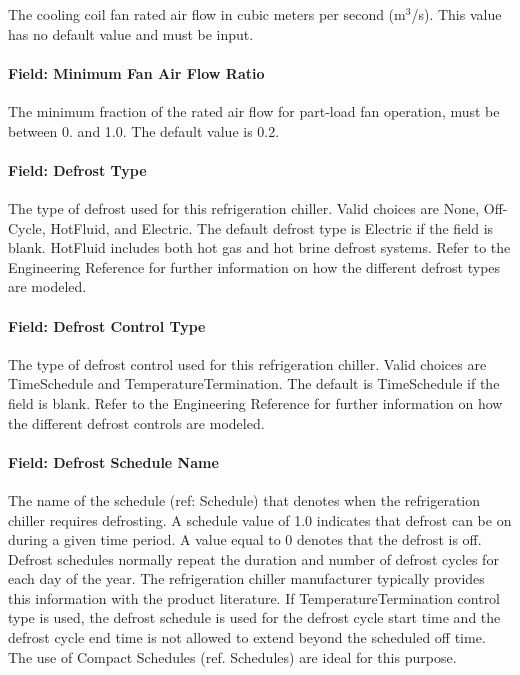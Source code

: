 The cooling coil fan rated air flow in cubic meters per second (m\(^{3}\)/s). This value has no default value and must be input.

\paragraph{Field: Minimum Fan Air Flow Ratio}\label{field-minimum-fan-air-flow-ratio-3}

The minimum fraction of the rated air flow for part-load fan operation, must be between 0. and 1.0. The default value is 0.2.

\paragraph{Field: Defrost Type}\label{field-defrost-type-1}

The type of defrost used for this refrigeration chiller. Valid choices are None, Off-Cycle, HotFluid, and Electric. The default defrost type is Electric if the field is blank. HotFluid includes both hot gas and hot brine defrost systems. Refer to the Engineering Reference for further information on how the different defrost types are modeled.

\paragraph{Field: Defrost Control Type}\label{field-defrost-control-type-1}

The type of defrost control used for this refrigeration chiller. Valid choices are TimeSchedule and TemperatureTermination. The default is TimeSchedule if the field is blank. Refer to the Engineering Reference for further information on how the different defrost controls are modeled.

\paragraph{Field: Defrost Schedule Name}\label{field-defrost-schedule-name-1}

The name of the schedule (ref: Schedule) that denotes when the refrigeration chiller requires defrosting. A schedule value of 1.0 indicates that defrost can be on during a given time period. A value equal to 0 denotes that the defrost is off. Defrost schedules normally repeat the duration and number of defrost cycles for each day of the year. The refrigeration chiller manufacturer typically provides this information with the product literature. If TemperatureTermination control type is used, the defrost schedule is used for the defrost cycle start time and the defrost cycle end time is not allowed to extend beyond the scheduled off time. The use of Compact Schedules (ref. Schedules) are ideal for this purpose.

